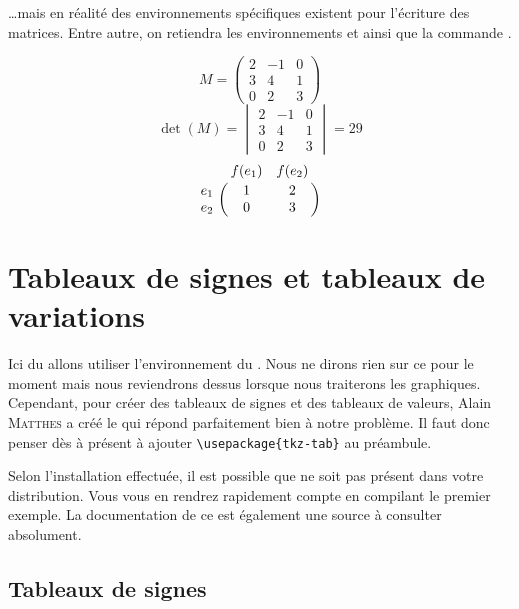 \documentclass[10pt,french,openright,twoside]{book}
\begin{document}
\dots mais en réalité des environnements spécifiques existent pour l'écriture des matrices. Entre autre, on retiendra les environnements  et  ainsi que la commande .\bigskip

{\NewFont
\begin{SideBySideExample}
    \[M =
    	\begin{pmatrix}
    		2 & -1 & 0 \\
            3 & 4 & 1 \\
            0 & 2 & 3
    	\end{pmatrix}
    \]\medskip
    \[\det(M) =
    	\begin{vmatrix}
    		2 & -1 & 0 \\
            3 & 4 & 1 \\
            0 & 2 & 3
    	\end{vmatrix} = 29
    \]\medskip
    \[
        \bordermatrix{
            & f(e_1) & f(e_2) \cr
        e_1 & 1 & 2 \cr
        e_2 & 0 & 3 \cr}
    \]
\end{SideBySideExample}
}\bigskip

\section{Tableaux de signes et tableaux de variations}

Ici du allons utiliser l'environnement  du \package {}. Nous ne dirons rien sur ce \package pour le moment mais nous reviendrons dessus lorsque nous traiterons les graphiques. Cependant, pour créer des tableaux de signes et des tableaux de valeurs, Alain \textsc{Matthes} a créé le \package {} qui répond parfaitement bien à notre problème. Il faut donc penser dès à présent à ajouter \verb!\usepackage{tkz-tab}! au préambule.

\begin{info}
    Selon l'installation effectuée, il est possible que  ne soit pas présent dans votre distribution. Vous vous en rendrez rapidement compte en compilant le premier exemple. La documentation de ce \package est également une source à consulter absolument.
\end{info}

\subsection{Tableaux de signes}
\end{document}

